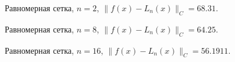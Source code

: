 \documentclass[12pt, a4paper]{article}
\begin{document}
\begin{figure}[h]
    \caption{Равномерная сетка, $n = 2$, $ \| f(x) - L_n(x)  \|_C = 68.31 $.}
\end{figure}

\begin{figure}[h]
    \caption{Равномерная сетка, $n = 8$, $ \| f(x) - L_n(x)  \|_C = 64.25 $.}
\end{figure}

\pagebreak


\begin{figure}[h]
    \caption{Равномерная сетка, $n = 16$, $ \| f(x) - L_n(x)  \|_C = 56.1911 $.}
\end{figure}
\end{document}
